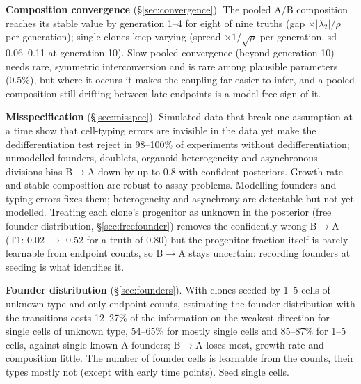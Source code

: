 \documentclass[10pt,a4paper]{article}
\newcommand{\BA}{B$\to$A}
\begin{document}
\textbf{Composition convergence} (\S\ref{sec:convergence}). The pooled A/B composition reaches its stable value by generation 1--4 for eight of nine truths (gap $\times |\lambda_2|/\rho$ per generation); single clones keep varying (spread $\times 1/\sqrt\rho$ per generation, sd 0.06--0.11 at generation 10). Slow pooled convergence (beyond generation 10) needs rare, symmetric interconversion and is rare among plausible parameters (0.5\%), but where it occurs it makes the coupling far easier to infer, and a pooled composition still drifting between late endpoints is a model-free sign of it.

\textbf{Misspecification} (\S\ref{sec:misspec}). Simulated data that break one assumption at a time show that cell-typing errors are invisible in the data yet make the dedifferentiation test reject in 98--100\% of experiments without dedifferentiation; unmodelled founders, doublets, organoid heterogeneity and asynchronous divisions bias \BA{} down by up to 0.8 with confident posteriors. Growth rate and stable composition are robust to assay problems. Modelling founders and typing errors fixes them; heterogeneity and asynchrony are detectable but not yet modelled. Treating each clone's progenitor as unknown in the posterior (free founder distribution, \S\ref{sec:freefounder}) removes the confidently wrong \BA{} (T1: 0.02 $\to$ 0.52 for a truth of 0.80) but the progenitor fraction itself is barely learnable from endpoint counts, so \BA{} stays uncertain: recording founders at seeding is what identifies it.

\textbf{Founder distribution} (\S\ref{sec:founders}). With clones seeded by 1--5 cells of unknown type and only endpoint counts, estimating the founder distribution with the transitions costs 12--27\% of the information on the weakest direction for single cells of unknown type, 54--65\% for mostly single cells and 85--87\% for 1--5 cells, against single known A founders; \BA{} loses most, growth rate and composition little. The number of founder cells is learnable from the counts, their types mostly not (except with early time points). Seed single cells.
\end{document}

